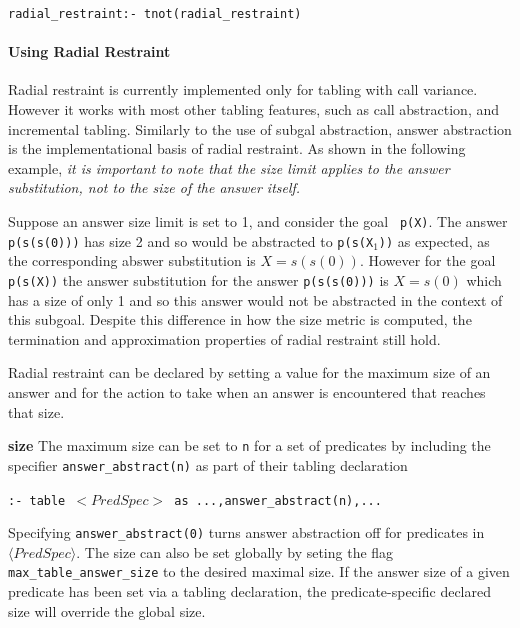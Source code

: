 {\tt radial\_restraint:- tnot(radial\_restraint)}


\paragraph*{Using Radial Restraint}
%
Radial restraint is currently implemented only for tabling with call
variance.  However it works with most other tabling features, such as
call abstraction, and incremental tabling.
%
Similarly to the use of subgal abstraction, answer abstraction is the
implementational basis of radial restraint.  As shown in the following
example, {\em it is important to note that the size limit applies to
  the answer substitution, not to the size of the answer itself.}

\begin{example}
Suppose an answer size limit is set to 1, and consider the goal {\tt
  p(X)}.  The answer {\tt p(s(s(0)))} has size 2 and so would be
abstracted to {\tt p(s(X$_1$))} as expected, as the corresponding
abswer substitution is $X = s(s(0))$.  However for the goal {\tt
  p(s(X))} the answer substitution for the answer {\tt p(s(s(0)))} is
$X = s(0)$ which has a size of only 1 and so this answer would not be
abstracted in the context of this subgoal.  Despite this difference in
how the size metric is computed, the termination and approximation
properties of radial restraint still hold.
\end{example}

Radial restraint can be declared by setting a value for the maximum
size of an answer and for the action to take when an answer is
encountered that reaches that size.
%
\bi
\item {\bf size} The maximum size can be set to {\tt n} for a set of
  predicates by including the specifier {\tt answer\_abstract(n)} as
  part of their tabling declaration

{\tt :- table $<PredSpec>$ as ...,answer\_abstract(n),...}

  Specifying {\tt answer\_abstract(0)} turns answer abstraction off
  for predicates in $\langle PredSpec \rangle$.  The size can also be
  set globally by seting the flag {\tt max\_table\_answer\_size} to
  the desired maximal size.  If the answer size of a given predicate
  has been set via a tabling declaration, the predicate-specific
  declared size will override the global size.

